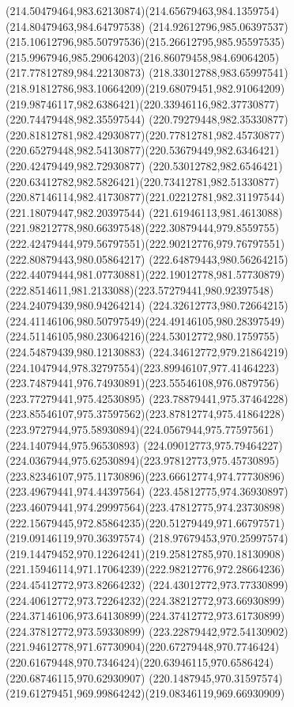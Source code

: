 {{\curveto(214.50479464,983.62130874)(214.65679463,984.1359754)(214.80479463,984.64797538)
\curveto(214.92612796,985.06397537)(215.10612796,985.50797536)(215.26612795,985.95597535)
\curveto(215.9967946,985.29064203)(216.86079458,984.69064205)(217.77812789,984.22130873)
\curveto(218.33012788,983.65997541)(218.91812786,983.10664209)(219.68079451,982.91064209)
\curveto(219.98746117,982.6386421)(220.33946116,982.37730877)(220.74479448,982.35597544)
\curveto(220.79279448,982.35330877)(220.81812781,982.42930877)(220.77812781,982.45730877)
\curveto(220.65279448,982.54130877)(220.53679449,982.6346421)(220.42479449,982.72930877)
\curveto(220.53012782,982.6546421)(220.63412782,982.5826421)(220.73412781,982.51330877)
\curveto(220.87146114,982.41730877)(221.02212781,982.31197544)(221.18079447,982.20397544)
\curveto(221.61946113,981.4613088)(221.98212778,980.66397548)(222.30879444,979.8559755)
\curveto(222.42479444,979.56797551)(222.90212776,979.76797551)(222.80879443,980.05864217)
\curveto(222.64879443,980.56264215)(222.44079444,981.07730881)(222.19012778,981.57730879)
\curveto(222.8514611,981.2133088)(223.57279441,980.92397548)(224.24079439,980.94264214)
\curveto(224.32612773,980.72664215)(224.41146106,980.50797549)(224.49146105,980.28397549)
\curveto(224.51146105,980.23064216)(224.53012772,980.1759755)(224.54879439,980.12130883)
\curveto(224.34612772,979.21864219)(224.1047944,978.32797554)(223.89946107,977.41464223)
\curveto(223.74879441,976.74930891)(223.55546108,976.0879756)(223.77279441,975.42530895)
\curveto(223.78879441,975.37464228)(223.85546107,975.37597562)(223.87812774,975.41864228)
\curveto(223.9727944,975.58930894)(224.0567944,975.77597561)(224.1407944,975.96530893)
\curveto(224.09012773,975.79464227)(224.0367944,975.62530894)(223.97812773,975.45730895)
\curveto(223.82346107,975.11730896)(223.66612774,974.77730896)(223.49679441,974.44397564)
\curveto(223.45812775,974.36930897)(223.46079441,974.29997564)(223.47812775,974.23730898)
\curveto(222.15679445,972.85864235)(220.51279449,971.66797571)(219.09146119,970.36397574)
\curveto(218.97679453,970.25997574)(219.14479452,970.12264241)(219.25812785,970.18130908)
\curveto(221.15946114,971.17064239)(222.98212776,972.28664236)(224.45412772,973.82664232)
\curveto(224.43012772,973.77330899)(224.40612772,973.72264232)(224.38212772,973.66930899)
\curveto(224.37146106,973.64130899)(224.37412772,973.61730899)(224.37812772,973.59330899)
\curveto(223.22879442,972.54130902)(221.94612778,971.67730904)(220.67279448,970.7746424)
\curveto(220.61679448,970.7346424)(220.63946115,970.6586424)(220.68746115,970.62930907)
\curveto(220.1487945,970.31597574)(219.61279451,969.99864242)(219.08346119,969.66930909)
}}
